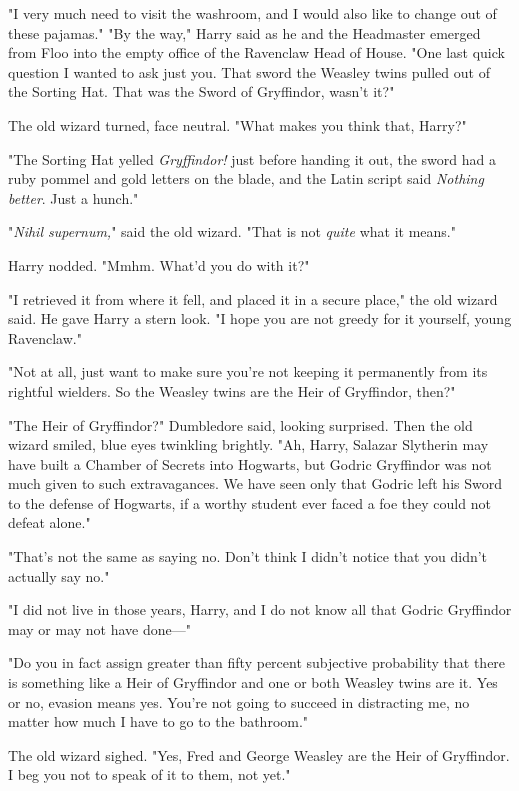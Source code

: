 "I very much need to visit the washroom, and I would also like to change out of
these pajamas."
\sbreak
"By the way," Harry said as he and the Headmaster emerged from Floo into the
empty office of the Ravenclaw Head of House. "One last quick question I wanted
to ask just you. That sword the Weasley twins pulled out of the Sorting Hat.
That was the Sword of Gryffindor, wasn't it?"

The old wizard turned, face neutral. "What makes you think that, Harry?"

"The Sorting Hat yelled \emph{Gryffindor!} just before handing it out, the
sword had a ruby pommel and gold letters on the blade, and the Latin script
said \emph{Nothing better}. Just a hunch."

"\emph{Nihil supernum,}" said the old wizard. "That is not \emph{quite} what it
means."

Harry nodded. "Mmhm. What'd you do with it?"

"I retrieved it from where it fell, and placed it in a secure place," the old
wizard said. He gave Harry a stern look. "I hope you are not greedy for it
yourself, young Ravenclaw."

"Not at all, just want to make sure you're not keeping it permanently from its
rightful wielders. So the Weasley twins are the Heir of Gryffindor, then?"

"The Heir of Gryffindor?" Dumbledore said, looking surprised. Then the old
wizard smiled, blue eyes twinkling brightly. "Ah, Harry, Salazar Slytherin may
have built a Chamber of Secrets into Hogwarts, but Godric Gryffindor was not
much given to such extravagances. We have seen only that Godric left his Sword
to the defense of Hogwarts, if a worthy student ever faced a foe they could not
defeat alone."

"That's not the same as saying no. Don't think I didn't notice that you didn't
actually say no."

"I did not live in those years, Harry, and I do not know all that Godric
Gryffindor may or may not have done---"

"Do you in fact assign greater than fifty percent subjective probability that
there is something like a Heir of Gryffindor and one or both Weasley twins are
it. Yes or no, evasion means yes. You're not going to succeed in distracting
me, no matter how much I have to go to the bathroom."

The old wizard sighed. "Yes, Fred and George Weasley are the Heir of
Gryffindor. I beg you not to speak of it to them, not yet."

